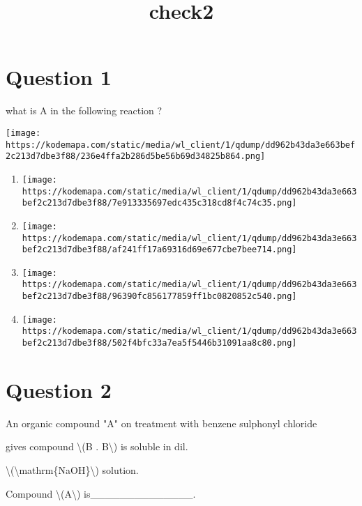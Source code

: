 \documentclass{article}
\title{check2}
\begin{document}
                    \maketitle
                    \section*{Question 1}
what is A in the following reaction ?



\texttt{[image: https://kodemapa.com/static/media/wl\_client/1/qdump/dd962b43da3e663bef2c213d7dbe3f88/236e4ffa2b286d5be56b69d34825b864.png]}\\


\begin{enumerate}[label=(\alph*)]
\item \texttt{[image: https://kodemapa.com/static/media/wl\_client/1/qdump/dd962b43da3e663bef2c213d7dbe3f88/7e913335697edc435c318cd8f4c74c35.png]}


\item \texttt{[image: https://kodemapa.com/static/media/wl\_client/1/qdump/dd962b43da3e663bef2c213d7dbe3f88/af241ff17a69316d69e677cbe7bee714.png]}


\item \texttt{[image: https://kodemapa.com/static/media/wl\_client/1/qdump/dd962b43da3e663bef2c213d7dbe3f88/96390fc856177859ff1bc0820852c540.png]}


\item \texttt{[image: https://kodemapa.com/static/media/wl\_client/1/qdump/dd962b43da3e663bef2c213d7dbe3f88/502f4bfc33a7ea5f5446b31091aa8c80.png]}


\end{enumerate}
\newpage
\section*{Question 2}
An organic compound "A" on treatment with benzene sulphonyl chloride

gives compound \textbackslash(B . B\textbackslash) is soluble in dil.

\textbackslash(\textbackslash mathrm\{NaOH\}\textbackslash) solution.~



Compound \textbackslash(A\textbackslash) is\_\_\_\_\_\_\_\_\_\_\_\_\_\_.
\end{document}
